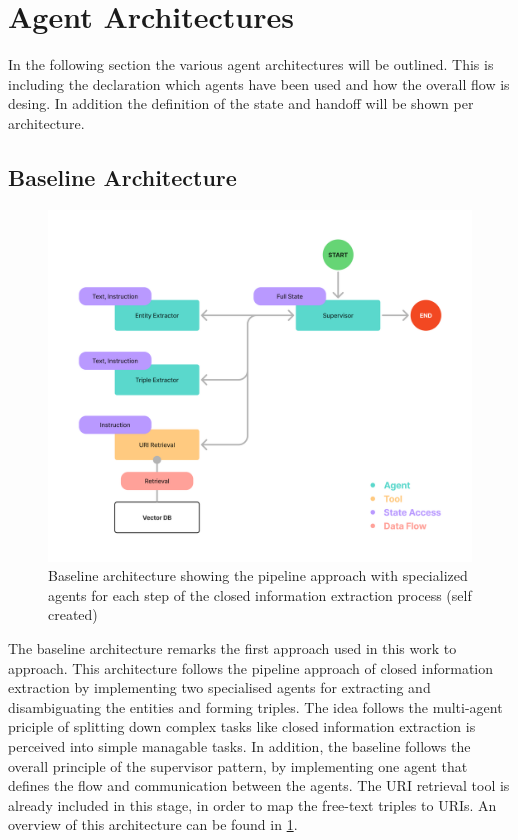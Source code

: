 \documentclass[a4paper,oneside,bibliography=totoc]{scrbook}
\begin{document}
\section{Agent Architectures}
\label{sec:agent_architectures}

In the following section the various agent architectures will be outlined. This is including the declaration which agents have been used and how the overall flow is desing. In addition the definition of the state and handoff will be shown per architecture.

\subsection{Baseline Architecture}
\label{subsec:baseline}

\begin{figure}[h]
  \centering
  \includegraphics[width=\textwidth]{figures/Baseline Architecture.png}
  \caption{Baseline architecture showing the pipeline approach with specialized agents for each step of the closed information extraction process (self created)}
  \label{fig:baseline_architecture}
\end{figure}

The baseline architecture remarks the first approach used in this work to approach. This architecture follows the pipeline approach of closed information extraction by implementing two specialised agents for extracting and disambiguating the entities and forming triples. The idea follows the multi-agent priciple of splitting down complex tasks like closed information extraction is perceived \cite{Josifoski2021} into simple managable tasks. In addition, the baseline follows the overall principle of the supervisor pattern, by implementing one agent that defines the flow and communication between the agents. The URI retrieval tool is already included in this stage, in order to map the free-text triples to URIs. An overview of this architecture can be found in \ref{fig:baseline_architecture}.
\end{document}
